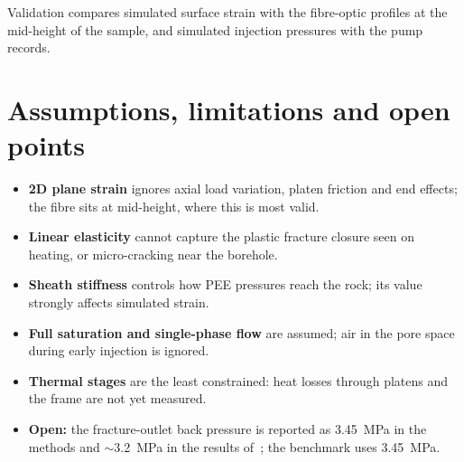 \documentclass[11pt,a4paper]{article}
\begin{document}
Validation compares simulated surface strain with the fibre-optic profiles at
the mid-height of the sample, and simulated injection pressures with the pump
records.

\section{Assumptions, limitations and open points}
\begin{itemize}
  \item \textbf{2D plane strain} ignores axial load variation, platen friction
        and end effects; the fibre sits at mid-height, where this is most valid.
  \item \textbf{Linear elasticity} cannot capture the plastic fracture closure
        seen on heating, or micro-cracking near the borehole.
  \item \textbf{Sheath stiffness} controls how PEE pressures reach the rock; its
        value strongly affects simulated strain.
  \item \textbf{Full saturation and single-phase flow} are assumed; air in the
        pore space during early injection is ignored.
  \item \textbf{Thermal stages} are the least constrained: heat losses through
        platens and the frame are not yet measured.
  \item \textbf{Open:} the fracture-outlet back pressure is reported as
        \SI{3.45}{MPa} in the methods and $\sim$\SI{3.2}{MPa} in the results
        of~\cite{McDermott2018}; the benchmark uses \SI{3.45}{MPa}.
\end{itemize}



\end{document}
